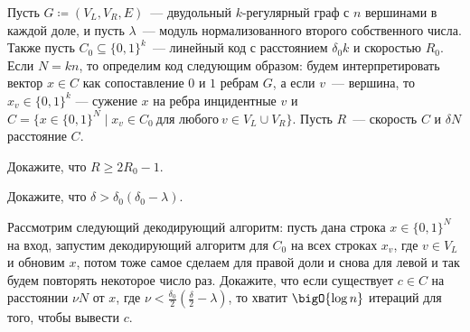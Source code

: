 Пусть $G \coloneqq (V_L, V_R, E)$~--- двудольный $k$-регулярный граф с $n$ вершинами в каждой доле, и
пусть $\lambda$~--- модуль нормализованного второго собственного числа. Также пусть $C_0 \subseteq \{0,
1\}^k$~--- линейный код с расстоянием $\delta_0 k$ и скоростью $R_0$. Если $N = kn$, то определим код
следующим образом: будем интерпретировать вектор $x \in C$ как сопоставление $0$ и $1$ ребрам $G$, а если
$v$~--- вершина, то $x_v \in \{0, 1\}^k$ --- сужение $x$ на ребра инцидентные $v$ и $C = \{x \in \{0,
1\}^N \mid x_v \in C_0~\text{для любого}~v \in V_L \cup V_R\}$. Пусть $R$~--- скорость $C$ и $\delta N$
расстояние $C$.
\begin{enumcyr}
    \item Докажите, что $R \ge 2R_0 - 1$.
    \item Докажите, что $\delta > \delta_0 (\delta_0 - \lambda)$.
    \item Рассмотрим следующий декодирующий алгоритм: пусть дана строка $x \in \{0, 1\}^N$ на вход,
        запустим декодирующий алгоритм для $C_0$ на всех строках $x_v$, где $v \in V_L$ и обновим $x$,
        потом тоже самое сделаем для правой доли и снова для левой и так будем повторять некоторое число
        раз. Докажите, что если существует $c \in C$ на расстоянии $\nu N$ от $x$, где $\nu <
        \frac{\delta_0}{2} (\frac{\delta}{2} - \lambda)$, то хватит $\bigO{\log n}$ итераций для того, чтобы
        вывести $c$.
\end{enumcyr}